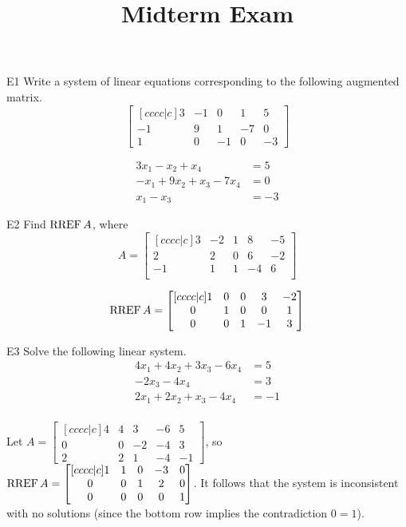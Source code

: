 \documentclass{sbgLAexam}
\title{Midterm Exam}
\begin{document}
\begin{problem}{E1}
Write a system of linear equations corresponding to the following
augmented matrix.
\[
\begin{bmatrix}[cccc|c]
3 & -1 & 0 & 1 & 5 \\
-1 & 9 & 1 & -7 & 0 \\
1 & 0 & -1 & 0 & -3
\end{bmatrix}
\]
\end{problem}
\begin{solution}
\begin{align*}
3x_1-x_2+x_4 &= 5 \\
-x_1+9x_2+x_3-7x_4 &= 0 \\
x_1-x_3 &= -3
\end{align*}
\end{solution}

\begin{problem}{E2}
Find \(\operatorname{RREF} A\), where
\[
  A =
  \begin{bmatrix}[cccc|c]
    3 & -2 & 1 & 8 & -5 \\
    2 & 2 & 0 & 6 & -2 \\
    -1 & 1 & 1 & -4 & 6 \\
  \end{bmatrix}
\]
\end{problem}
\begin{solution}
\[
  \operatorname{RREF} A =
  \begin{bmatrix}[cccc|c]
    1 & 0 & 0 & 3 & -2 \\
    0 & 1 & 0 & 0 & 1 \\
    0 & 0 & 1 & -1 & 3
  \end{bmatrix}
\]
\end{solution}

\begin{extract}\newpage\end{extract}
\begin{problem}{E3}
Solve the following linear system.
\begin{align*}
4x_1+4x_2+3x_3-6x_4 &= 5 \\
-2x_3-4x_4 &= 3 \\
2x_1+2x_2+x_3-4x_4 &= -1 \\
\end{align*}
\end{problem}
\begin{solution}
Let \(A =
  \begin{bmatrix}[cccc|c]
    4 & 4 & 3 & -6 & 5 \\
    0 & 0 & -2 & -4 & 3 \\
    2 & 2 & 1 & -4 & -1
  \end{bmatrix}
\), so \(\operatorname{RREF} A =
  \begin{bmatrix}[cccc|c]
    1 & 1 & 0 & -3 & 0 \\
    0 & 0 & 1 & 2 & 0 \\
    0 & 0 & 0 & 0 & 1
  \end{bmatrix}
\). It follows that the system is inconsistent with no solutions
(since the bottom row implies the contradiction \(0=1\)).
\end{solution}
\end{document}
